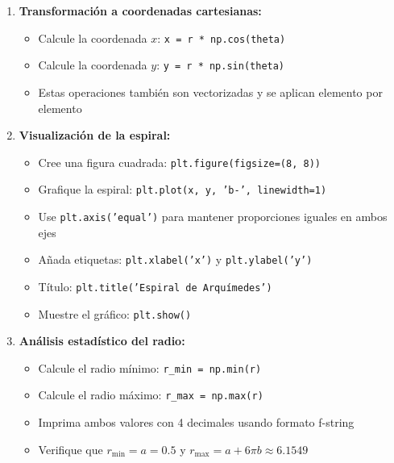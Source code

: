 \documentclass[10pt]{article}
\begin{document}
\begin{tcolorbox}[title={Pregunta 2 – Espiral de Arquímedes parametrizada}]
\begin{enumerate}
  \item \textbf{Transformación a coordenadas cartesianas:}
  \begin{itemize}
    \item Calcule la coordenada $x$: \texttt{x = r * np.cos(theta)}
    \item Calcule la coordenada $y$: \texttt{y = r * np.sin(theta)}
    \item Estas operaciones también son vectorizadas y se aplican elemento por elemento
  \end{itemize}
  
  \item \textbf{Visualización de la espiral:}
  \begin{itemize}
    \item Cree una figura cuadrada: \texttt{plt.figure(figsize=(8, 8))}
    \item Grafique la espiral: \texttt{plt.plot(x, y, 'b-', linewidth=1)}
    \item Use \texttt{plt.axis('equal')} para mantener proporciones iguales en ambos ejes
    \item Añada etiquetas: \texttt{plt.xlabel('x')} y \texttt{plt.ylabel('y')}
    \item Título: \texttt{plt.title('Espiral de Arquímedes')}
    \item Muestre el gráfico: \texttt{plt.show()}
  \end{itemize}
  
  \item \textbf{Análisis estadístico del radio:}
  \begin{itemize}
    \item Calcule el radio mínimo: \texttt{r\_min = np.min(r)}
    \item Calcule el radio máximo: \texttt{r\_max = np.max(r)}
    \item Imprima ambos valores con 4 decimales usando formato f-string
    \item Verifique que $r_{\text{min}} = a = 0.5$ y $r_{\text{max}} = a + 6\pi b \approx 6.1549$
  \end{itemize}
\end{enumerate}

\end{tcolorbox}


\end{document}
